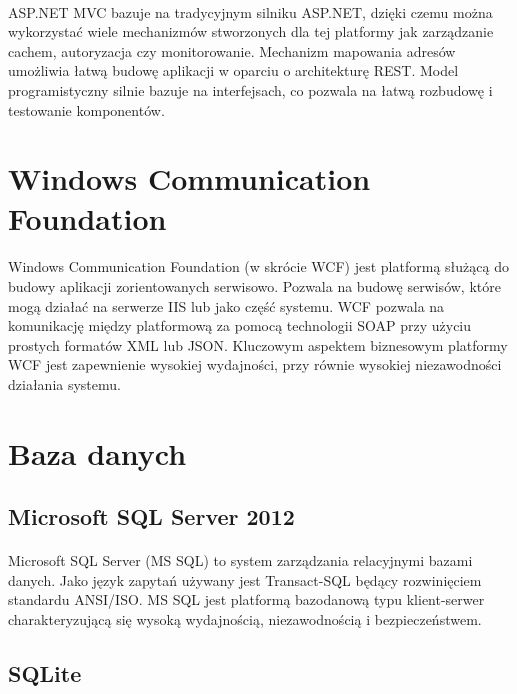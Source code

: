 \paragraph{}
ASP.NET MVC bazuje na tradycyjnym silniku ASP.NET, dzięki czemu można wykorzystać wiele mechanizmów stworzonych dla tej platformy jak zarządzanie cachem, autoryzacja czy monitorowanie. Mechanizm mapowania adresów umożliwia łatwą budowę aplikacji w oparciu o architekturę REST. Model programistyczny silnie bazuje na interfejsach, co pozwala na łatwą rozbudowę i testowanie komponentów.

\section{ Windows Communication Foundation }
\label{sec:wcf}
\paragraph{}
Windows Communication Foundation (w skrócie WCF) jest platformą służącą do budowy aplikacji zorientowanych serwisowo. Pozwala na budowę serwisów, które mogą działać na serwerze IIS lub jako część systemu. WCF pozwala na komunikację między platformową za pomocą technologii SOAP przy użyciu prostych formatów XML lub JSON. Kluczowym aspektem biznesowym platformy WCF jest zapewnienie wysokiej wydajności, przy równie wysokiej niezawodności działania systemu.

\section{Baza danych}

\subsection{Microsoft SQL Server 2012}
\label{sub:mssql}
\paragraph{}
Microsoft SQL Server (MS SQL) to system zarządzania relacyjnymi bazami danych. Jako język zapytań używany jest Transact-SQL będący rozwinięciem standardu ANSI/ISO. MS SQL jest platformą bazodanową typu klient-serwer charakteryzującą się wysoką wydajnością, niezawodnością i bezpieczeństwem.

\subsection{SQLite} %
\label{sub:sqlite}
